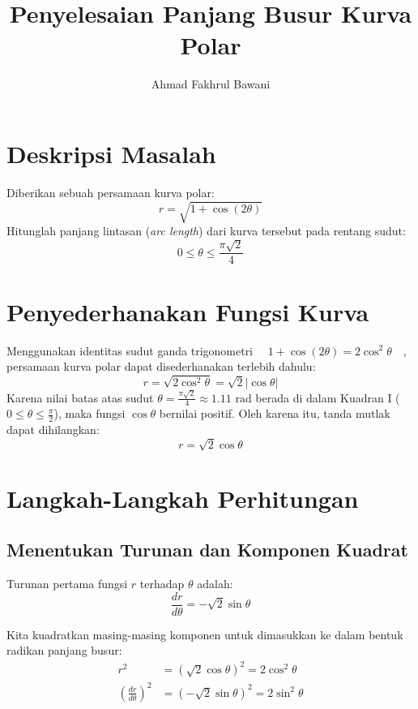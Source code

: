 \documentclass[11pt,a4paper]{article}
\title{\textbf{Penyelesaian Panjang Busur Kurva Polar}}
\author{Ahmad Fakhrul Bawani}
\date{}
\begin{document}
\maketitle

\section{Deskripsi Masalah}
Diberikan sebuah persamaan kurva polar:
\begin{equation}
  r = \sqrt{1 + \cos(2\theta)}
\end{equation}
Hitunglah panjang lintasan (\textit{arc length}) dari kurva tersebut pada rentang sudut:
\begin{equation*}
  0 \le \theta \le \frac{\pi\sqrt{2}}{4}
\end{equation*}

\section{Penyederhanakan Fungsi Kurva}
Menggunakan identitas sudut ganda trigonometri $\quad 1 + \cos(2\theta) = 2\cos^2\theta \quad$, persamaan kurva polar dapat disederhanakan terlebih dahulu:
\begin{equation*}
  r = \sqrt{2\cos^2\theta} = \sqrt{2}|\cos\theta|
\end{equation*}
Karena nilai batas atas sudut $\theta = \frac{\pi\sqrt{2}}{4} \approx 1.11\text{ rad}$ berada di dalam Kuadran I ($0 \le \theta \le \frac{\pi}{2}$), maka fungsi $\cos\theta$ bernilai positif. Oleh karena itu, tanda mutlak dapat dihilangkan:
\begin{equation}
  r = \sqrt{2}\cos\theta
\end{equation}

\section{Langkah-Langkah Perhitungan}

\subsection{Menentukan Turunan dan Komponen Kuadrat}
Turunan pertama fungsi $r$ terhadap $\theta$ adalah:
\begin{equation*}
  \frac{dr}{d\theta} = -\sqrt{2}\sin\theta
\end{equation*}

Kita kuadratkan masing-masing komponen untuk dimasukkan ke dalam bentuk radikan panjang busur:
\begin{align*}
  r^2 &= (\sqrt{2}\cos\theta)^2 = 2\cos^2\theta \\
  \left(\frac{dr}{d\theta}\right)^2 &= (-\sqrt{2}\sin\theta)^2 = 2\sin^2\theta
\end{align*}
\end{document}
